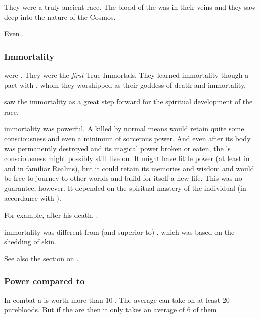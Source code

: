 They were a truly ancient race.
The blood of the \xss was in their veins and they saw deep into the nature of the Cosmos.

Even \Criseis {}. 







\subsubsection{Immortality}
\Dragons{} were . 
They were the \emph{first} True Immortals. 
They learned immortality though a pact with , whom they worshipped as their goddess of death and immortality.

 saw the \Draconic immortality as a great step forward for the spiritual development of the \ophidian race. 

\Draconian immortality was powerful. 
A \dragon killed by normal means would retain quite some consciousness and even a minimum of sorcerous power. 
And even after its body was permanently destroyed and its magical power broken or eaten, the \dragon's consciousness might possibly still live on. 
It might have little power (at least in \Miith and in familiar Realms), but it could retain its memories and wisdom and would be free to journey to other worlds and build for itself a new life. 
This was no guarantee, however. 
It depended on the spiritual mastery of the individual \dragon (in accordance with ). 

For example, \Sethicus {} after his death. 
\Nexagglachel {}. 

\Draconic immortality was different from (and superior to) , which was based on the shedding of skin. 

See also the section on . 





\subsubsection{Power compared to \resphain}
In combat a \dragon is worth more than 10 \resphain. 
The average \dragon can take on at least 20 purebloods. 
But if the \resphain are  then it only takes an average of 6 of them.











